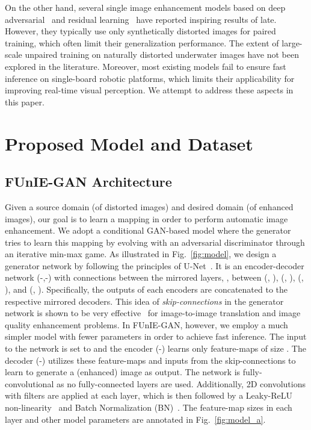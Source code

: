\documentclass[10pt,twocolumn,letterpaper]{article}
\begin{document}
On the other hand, several single image enhancement models based on deep adversarial~\cite{fabbri2018enhancing,yu2018underwater,li2018watergan} and residual learning~\cite{liu2019underwater} have reported inspiring results of late. However, they typically use only synthetically distorted images for paired training, which often limit their generalization performance. The extent of large-scale unpaired training on naturally distorted underwater images have not been explored in the literature. Moreover, most existing models fail to ensure fast inference on single-board robotic platforms, which limits their applicability for improving real-time visual perception. We attempt to address these aspects in this paper. 


 \section{Proposed Model and Dataset}



\subsection{FUnIE-GAN Architecture}
Given a source domain  (of distorted images) and desired domain  (of enhanced images), our goal is to learn a mapping  in order to perform automatic image enhancement. We adopt a conditional GAN-based model where the generator tries to learn this mapping by evolving with an adversarial discriminator through an iterative min-max game. As illustrated in Fig.~\ref{fig:model}, we design a generator network by following the principles of U-Net~\cite{ronneberger2015u}. 
It is an encoder-decoder network (-,-) with connections between the mirrored layers, \ie, between (, ), (, ), (, ), and (, ). Specifically, the outputs of each encoders are concatenated to the respective mirrored decoders. This idea of \textit{skip-connections} in the generator network is shown to be very effective~\cite{isola2017image,chen2018deep,fabbri2018enhancing} 
for image-to-image translation and image quality enhancement problems. In FUnIE-GAN, however, we employ a much simpler model with fewer parameters in order to achieve fast inference. The input to the network is set to  and the encoder (-) learns only  feature-maps of size . The decoder (-) utilizes these feature-maps and inputs from the skip-connections to learn to generate a  (enhanced) image as output. The network is fully-convolutional as no fully-connected layers are used. Additionally, 2D convolutions with  filters are applied at each layer, which is then followed by a Leaky-ReLU non-linearity~\cite{maas2013rectifier} and Batch Normalization (BN)~\cite{ioffe2015batch}. The feature-map sizes in each layer and other model parameters are annotated in Fig.~\ref{fig:model_a}.         
\end{document}
